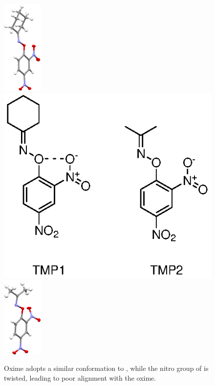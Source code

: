 \begin{refsection}
\begin{figure}
	\centering
	\includegraphics[width=2cm]{Figures/cyclohexanone-oxime-dnp-xray.pdf}
	\includegraphics[scale=0.74]{Figures/oximes.eps}
	\includegraphics[width=2cm]{Figures/acetone-oxime-dnp-xray.pdf}
	\caption[Oxime  adopts a similar conformation to .]{Oxime  adopts a similar conformation to , while the nitro group of  is twisted, leading to poor alignment with the oxime.}
	\label{fig:analogues}
\end{figure}


\end{refsection}
